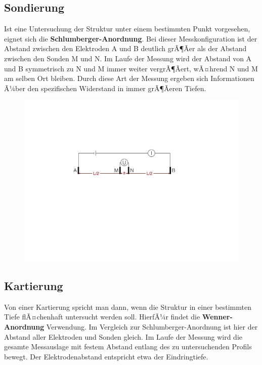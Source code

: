 \subsection{Sondierung}
Ist eine Untersuchung der Struktur unter einem bestimmten Punkt vorgesehen, eignet sich die \textbf{Schlumberger-Anordnung}.
Bei dieser Messkonfiguration ist der Abstand zwischen den Elektroden A und B deutlich grÃ¶Ãer als der Abstand zwischen den Sonden M und N. Im Laufe der Messung wird der Abstand von A und B symmetrisch zu N und M immer weiter vergrÃ¶Ãert, wÃ¤hrend N und M am selben Ort bleiben. Durch diese Art der Messung ergeben sich Informationen Ã¼ber den spezifischen Widerstand in immer grÃ¶Ãeren Tiefen.


\begin{figure}[H]
	\centering
	\includegraphics[width = \textwidth]{GeoelektrikBilder/SchlumbergerAnordnung}
\end{figure}


\subsection{Kartierung}
Von einer Kartierung spricht man dann, wenn die Struktur in einer bestimmten Tiefe flÃ¤chenhaft untersucht werden soll. HierfÃ¼r findet die \textbf{Wenner-Anordnung} Verwendung. Im Vergleich zur Schlumberger-Anordnung ist hier der Abstand aller Elektroden und Sonden gleich. Im Laufe der Messung wird die gesamte Messauslage mit festem Abstand entlang des zu untersuchenden Profils bewegt. Der Elektrodenabstand entspricht etwa der Eindringtiefe.


